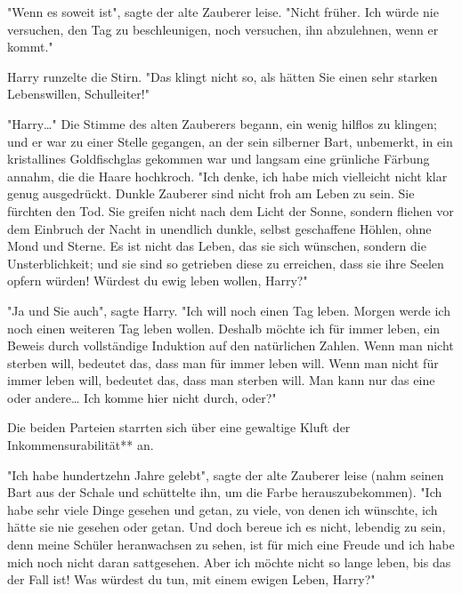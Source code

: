 {"Wenn es soweit ist", sagte der alte Zauberer leise. "Nicht früher. Ich würde nie versuchen, den Tag zu beschleunigen, noch versuchen, ihn abzulehnen, wenn er kommt."

Harry runzelte die Stirn. "Das klingt nicht so, als hätten Sie einen sehr starken Lebenswillen, Schulleiter!"

"Harry…" Die Stimme des alten Zauberers begann, ein wenig hilflos zu klingen; und er war zu einer Stelle gegangen, an der sein silberner Bart, unbemerkt, in ein kristallines Goldfischglas gekommen war und langsam eine grünliche Färbung annahm, die die Haare hochkroch. "Ich denke, ich habe mich vielleicht nicht klar genug ausgedrückt. Dunkle Zauberer sind nicht froh am Leben zu sein. Sie fürchten den Tod. Sie greifen nicht nach dem Licht der Sonne, sondern fliehen vor dem Einbruch der Nacht in unendlich dunkle, selbst geschaffene Höhlen, ohne Mond und Sterne. Es ist nicht das Leben, das sie sich wünschen, sondern die Unsterblichkeit; und sie sind so getrieben diese zu erreichen, dass sie ihre Seelen opfern würden! Würdest du ewig leben wollen, Harry?"

"Ja und Sie auch", sagte Harry. "Ich will noch einen Tag leben. Morgen werde ich noch einen weiteren Tag leben wollen. Deshalb möchte ich für immer leben, ein Beweis durch vollständige Induktion auf den natürlichen Zahlen. Wenn man nicht sterben will, bedeutet das, dass man für immer leben will. Wenn man nicht für immer leben will, bedeutet das, dass man sterben will. Man kann nur das eine oder andere… Ich komme hier nicht durch, oder?"

Die beiden Parteien starrten sich über eine gewaltige Kluft der Inkommensurabilität** an.

"Ich habe hundertzehn Jahre gelebt", sagte der alte Zauberer leise (nahm seinen Bart aus der Schale und schüttelte ihn, um die Farbe herauszubekommen). "Ich habe sehr viele Dinge gesehen und getan, zu viele, von denen ich wünschte, ich hätte sie nie gesehen oder getan. Und doch bereue ich es nicht, lebendig zu sein, denn meine Schüler heranwachsen zu sehen, ist für mich eine Freude und ich habe mich noch nicht daran sattgesehen. Aber ich möchte nicht so lange leben, bis das der Fall ist! Was würdest du tun, mit einem ewigen Leben, Harry?"

}
